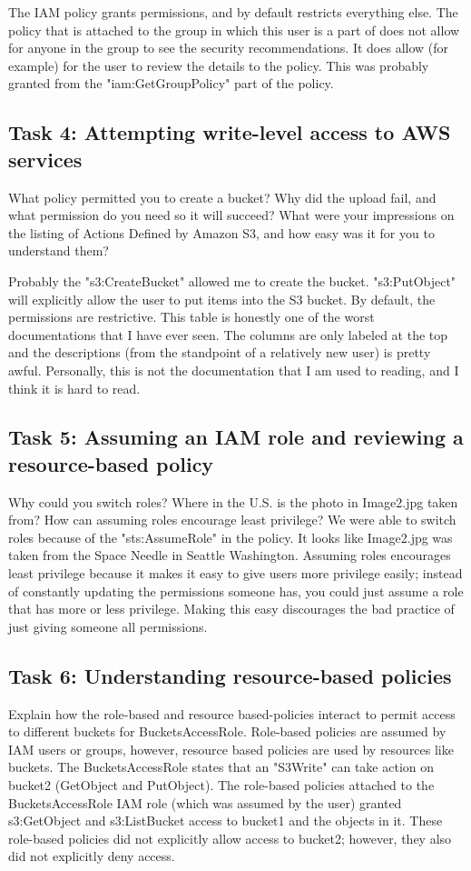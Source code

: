 \documentclass[11pt]{article}
\begin{document}
The IAM policy grants permissions, and by default restricts everything else. The policy that is attached to the group in which this user is a part of does not allow for anyone in the group to see the security recommendations. It does allow (for example) for the user to review the details to the policy. This was probably granted from the "iam:GetGroupPolicy" part of the policy.


\subsection*{Task 4: Attempting write-level access to AWS services}
What policy permitted you to create a bucket? Why did the upload fail, and what permission do you need so it will succeed? What were your impressions on the listing of Actions Defined by Amazon S3, and how easy was it for you to understand them?

Probably the "s3:CreateBucket" allowed me to create the bucket. "s3:PutObject" will explicitly allow the user to put items into the S3 bucket. By default, the permissions are restrictive. This table is honestly one of the worst documentations that I have ever seen. The columns are only labeled at the top and the descriptions (from the standpoint of a relatively new user) is pretty awful. Personally, this is not the documentation that I am used to reading, and I think it is hard to read.


\subsection*{Task 5: Assuming an IAM role and reviewing a resource-based policy}
Why could you switch roles? Where in the U.S. is the photo in Image2.jpg taken from? How can assuming roles encourage least privilege?
We were able to switch roles because of the "sts:AssumeRole" in the policy. It looks like Image2.jpg was taken from the Space Needle in Seattle Washington. Assuming roles encourages least privilege because it makes it easy to give users more privilege easily; instead of constantly updating the permissions someone has, you could just assume a role that has more or less privilege. Making this easy discourages the bad practice of just giving someone all permissions.


\subsection*{Task 6: Understanding resource-based policies}
Explain how the role-based and resource based-policies interact to permit access to different buckets for BucketsAccessRole.
Role-based policies are assumed by IAM users or groups, however, resource based policies are used by resources like buckets. The BucketsAccessRole states that an "S3Write" can take action on bucket2 (GetObject and PutObject). The role-based policies attached to the BucketsAccessRole IAM role (which was assumed by the user) granted s3:GetObject and s3:ListBucket access to bucket1 and the objects in it. These role-based policies did not explicitly allow access to bucket2; however, they also did not explicitly deny access.
\end{document}
